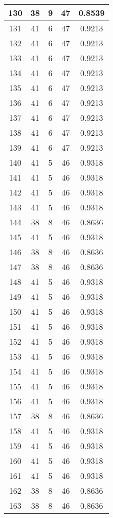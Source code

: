 \documentclass[letterpaper, 12pt]{article}
\begin{document}
\begin{longtable}{|c|c|c|c|c|}
\hline
130 & 38 & 9 & 47 & 0.8539 \\
\hline
131 & 41 & 6 & 47 & 0.9213 \\
\hline
132 & 41 & 6 & 47 & 0.9213 \\
\hline
133 & 41 & 6 & 47 & 0.9213 \\
\hline
134 & 41 & 6 & 47 & 0.9213 \\
\hline
135 & 41 & 6 & 47 & 0.9213 \\
\hline
136 & 41 & 6 & 47 & 0.9213 \\
\hline
137 & 41 & 6 & 47 & 0.9213 \\
\hline
138 & 41 & 6 & 47 & 0.9213 \\
\hline
139 & 41 & 6 & 47 & 0.9213 \\
\hline
140 & 41 & 5 & 46 & 0.9318 \\
\hline
141 & 41 & 5 & 46 & 0.9318 \\
\hline
142 & 41 & 5 & 46 & 0.9318 \\
\hline
143 & 41 & 5 & 46 & 0.9318 \\
\hline
144 & 38 & 8 & 46 & 0.8636 \\
\hline
145 & 41 & 5 & 46 & 0.9318 \\
\hline
146 & 38 & 8 & 46 & 0.8636 \\
\hline
147 & 38 & 8 & 46 & 0.8636 \\
\hline
148 & 41 & 5 & 46 & 0.9318 \\
\hline
149 & 41 & 5 & 46 & 0.9318 \\
\hline
150 & 41 & 5 & 46 & 0.9318 \\
\hline
151 & 41 & 5 & 46 & 0.9318 \\
\hline
152 & 41 & 5 & 46 & 0.9318 \\
\hline
153 & 41 & 5 & 46 & 0.9318 \\
\hline
154 & 41 & 5 & 46 & 0.9318 \\
\hline
155 & 41 & 5 & 46 & 0.9318 \\
\hline
156 & 41 & 5 & 46 & 0.9318 \\
\hline
157 & 38 & 8 & 46 & 0.8636 \\
\hline
158 & 41 & 5 & 46 & 0.9318 \\
\hline
159 & 41 & 5 & 46 & 0.9318 \\
\hline
160 & 41 & 5 & 46 & 0.9318 \\
\hline
161 & 41 & 5 & 46 & 0.9318 \\
\hline
162 & 38 & 8 & 46 & 0.8636 \\
\hline
163 & 38 & 8 & 46 & 0.8636 \\

\end{longtable}
\end{document}
